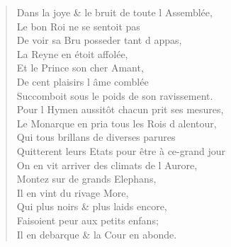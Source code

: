 \begin{verse}
Dans la joye \& le bruit de toute l\textquotesingle{} Assemblée, \\
\vin Le bon Roi ne se sentoit pas \\
\vin De voir sa Bru posseder tant d\textquotesingle{} appas, \\
\vin La Reyne en étoit affolée, \\
\vin Et le Prince son cher Amant, \\
\vin De cent plaisirs l\textquotesingle{} âme comblée \\
Succomboit sous le poids de son ravissement. \\
Pour l\textquotesingle{} Hymen aussitôt chacun prit ses mesures, \\
Le Monarque en pria tous les Rois d\textquotesingle{} alentour, \\
\vin Qui tous brillans de diverses parures \\
Quitterent leurs Etats pour être à ce-grand jour \\
On en vit arriver des climats de l\textquotesingle{} Aurore, \\
\vin Montez sur de grands Elephans, \\
\vin Il en vint du rivage More, \\
\vin Qui plus noirs \& plus laids encore, \\
\vin Faisoient peur aux petits enfans; \\
\vin Il en debarque \& la Cour en abonde.


\end{verse}
